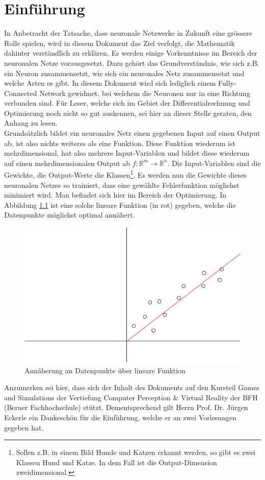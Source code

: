 \chapter{Einführung}
In Anbetracht der Tatsache, dass neuronale Netzwerke in Zukunft eine grössere Rolle spielen, wird in diesem Dokument
das Ziel verfolgt, die Mathematik dahinter verständlich zu erklären. Es werden einige Vorkenntnisse im Bereich der neuronalen Netze
vorausgesetzt. Dazu gehört das Grundverständnis, wie sich z.B. ein Neuron zusammensetzt, wie sich ein neuronales Netz
zusammensetzt und welche Arten es gibt. In diesem Dokument wird sich lediglich einem Fully-Connected Network gewidmet,
bei welchem die Neuronen nur in eine Richtung verbunden sind. Für Leser, welche sich im Gebiet der
Differentialrechnung und Optimierung noch nicht so gut auskennen, sei hier an dieser Stelle geraten, den Anhang zu lesen.
\\

Grundsätzlich bildet ein neuronales Netz einen gegebenen Input auf einen Output ab, ist also nichts weiteres als
eine Funktion. Diese Funktion wiederum ist mehrdimensional, hat also mehrere Input-Variablen und bildet diese wiederum
auf einen mehrdimensionalen Output ab $f: \mathbb{R}^m \rightarrow \mathbb{R}^n$. Die Input-Variablen sind die Gewichte, die Output-Werte
die Klassen\footnote{Sollen z.B. in einem Bild Hunde und Katzen erkannt werden, so gibt es zwei Klassen \glqq Hund\grqq{} und \glqq Katze\grqq.
In dem Fall ist die Output-Dimension zweidimensional.}. Es werden nun die Gewichte dieses neuronalen Netzes so trainiert, dass eine gewählte Fehlerfunktion
möglichst minimiert wird. Man befindet sich hier im Bereich der Optimierung. In Abbildung \ref{fig:05_approximation}
ist eine solche lineare Funktion (in rot) gegeben, welche die Datenpunkte möglichst optimal annähert.
\begin{figure}[h!]
    \begin{center}
        \includegraphics[width=0.3\linewidth]{../common/00_introduction/00_resources/00_approximation.png}
    \end{center}
    \caption{Annäherung an Datenpunkte über lineare Funktion}
    \label{fig:05_approximation}
\end{figure}

Anzumerken sei hier, dass sich der Inhalt des Dokuments auf den Kursteil \glqq Games and Simulations\grqq{} der Vertiefung
\glqq Computer Perception \& Virtual Reality\grqq{} der BFH (Berner Fachhochschule) stützt. Dementsprechend gilt Herrn
Prof. Dr. Jürgen Eckerle ein Dankeschön für die Einführung, welche er an zwei Vorlesungen gegeben hat.